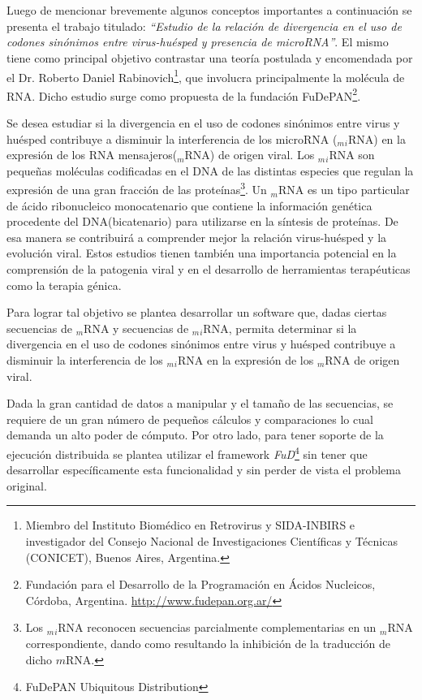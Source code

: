 \section*{\remo}
\par Luego de mencionar brevemente algunos conceptos importantes a continuación se presenta el trabajo titulado: \emph{``Estudio de la relación de divergencia en el uso de codones sinónimos entre virus-huésped y presencia de microRNA''}. El mismo tiene como principal objetivo contrastar una teoría postulada y encomendada por el Dr. Roberto Daniel Rabinovich\footnote{Miembro del Instituto Biomédico en Retrovirus y SIDA-INBIRS e investigador del Consejo Nacional de Investigaciones Científicas y Técnicas (CONICET), Buenos Aires, Argentina.}, que involucra principalmente la molécula de RNA. Dicho estudio surge como propuesta de la fundación FuDePAN\footnote{Fundación para el Desarrollo de la Programación en Ácidos Nucleicos, Córdoba, Argentina. \url{http://www.fudepan.org.ar/}}.

\par Se desea estudiar si la divergencia en el uso de codones sinónimos entre virus y huésped contribuye a disminuir la interferencia de los microRNA ($_m$$_i$RNA) en la expresión de los RNA mensajeros($_m$RNA) de origen viral. Los $_m$$_i$RNA son pequeñas moléculas codificadas en el DNA de las distintas especies que regulan la expresión de una gran fracción de las proteínas\footnote{Los $_m$$_i$RNA reconocen secuencias parcialmente complementarias en un $_m$RNA correspondiente, dando como resultando la inhibición de la traducción de dicho $m$RNA.}. Un $_m$RNA es un tipo particular de ácido ribonucleico monocatenario que contiene la información genética procedente del DNA(bicatenario) para utilizarse en la síntesis de proteínas. De esa manera se contribuirá a comprender mejor la relación virus-huésped y la evolución viral. Estos estudios tienen también una importancia potencial en la comprensión de la patogenia viral y en el desarrollo de herramientas terapéuticas como la terapia génica.

\par Para lograr tal objetivo se plantea desarrollar un software que, dadas ciertas secuencias de $_m$RNA y secuencias de $_m$$_i$RNA, permita determinar si la divergencia en el uso de codones sinónimos entre virus y huésped contribuye a disminuir la interferencia de los $_m$$_i$RNA en la expresión de los $_m$RNA de origen viral.

\par Dada la gran cantidad de datos a manipular y el tamaño de las secuencias, se requiere de un gran número de pequeños cálculos y comparaciones lo cual demanda un alto poder de cómputo. Por otro lado, para tener soporte de la ejecución distribuida se plantea utilizar el framework \emph{FuD}\footnote{FuDePAN Ubiquitous Distribution}\cite{clus09} sin tener que desarrollar específicamente esta funcionalidad y sin perder de vista el problema original.

